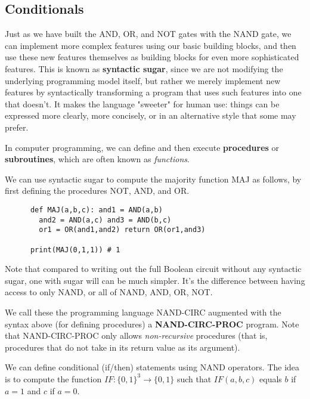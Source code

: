 \subsection{Conditionals}

  Just as we have built the AND, OR, and NOT gates with the NAND gate, we can implement more complex features using our basic building blocks, and then use these new features themselves as building blocks for even more sophisticated features. This is known as \textbf{syntactic sugar}, since we are not modifying the underlying programming model itself, but rather we merely implement new features by syntactically transforming a program that uses such features into one that doesn’t. It makes the language "sweeter" for human use: things can be expressed more clearly, more concisely, or in an alternative style that some may prefer.

  In computer programming, we can define and then execute \textbf{procedures} or \textbf{subroutines}, which are often known as \textit{functions}. 

  \begin{example}
    We can use syntactic sugar to compute the majority function MAJ as follows, by first defining the procedures NOT, AND, and OR. 
    \begin{lstlisting}
      def MAJ(a,b,c): and1 = AND(a,b)
        and2 = AND(a,c) and3 = AND(b,c)
        or1 = OR(and1,and2) return OR(or1,and3)

      print(MAJ(0,1,1)) # 1
    \end{lstlisting}
  \end{example}

  Note that compared to writing out the full Boolean circuit without any syntactic sugar, one with sugar will can be much simpler. It's the difference between having access to only NAND, or all of NAND, AND, OR, NOT. 

  \begin{definition}
    We call these the programming language NAND-CIRC augmented with the syntax above (for defining procedures) a \textbf{NAND-CIRC-PROC} program. Note that NAND-CIRC-PROC only allows \textit{non-recursive} procedures (that is, procedures that do not take in its return value as its argument). 
  \end{definition}

  We can define conditional (if/then) statements using NAND operators. The idea is to compute the function $IF: \{0,1\}^3 \longrightarrow \{0,1\}$ such that $IF(a, b, c)$ equals $b$ if $a = 1$ and $c$ if $a = 0$. 

